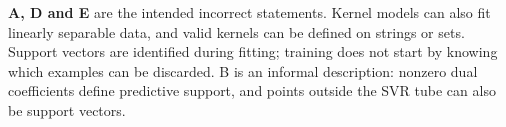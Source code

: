 \textbf{A, D and E} are the intended incorrect statements. Kernel models can also fit linearly separable data, and valid kernels can be defined on strings or sets. Support vectors are identified during fitting; training does not start by knowing which examples can be discarded. B is an informal description: nonzero dual coefficients define predictive support, and points outside the SVR tube can also be support vectors.

